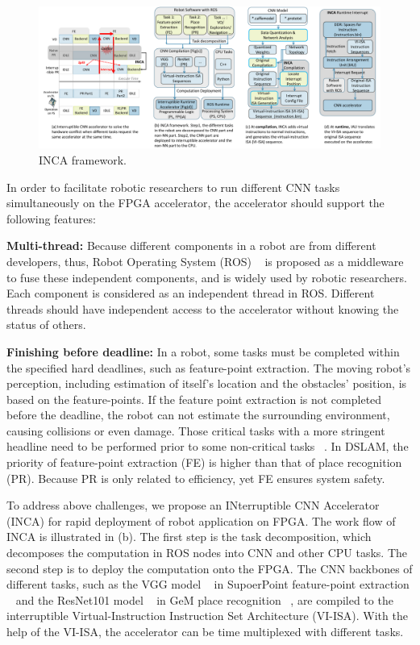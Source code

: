 \begin{figure}[t]
	\centering
    \includegraphics[width=0.99\linewidth]{fig/inca.pdf}
    \caption{ INCA framework.  
    }
	\label{fig:inca}
\end{figure}

In order to facilitate robotic researchers to run different CNN tasks simultaneously on the FPGA accelerator, the accelerator should support the following features:

\textbf{Multi-thread:} Because different components in a robot are from different developers, thus, Robot Operating System (ROS)  ~\cite{quigley2009ros} is proposed as a middleware to fuse these independent components, and is widely used by robotic researchers. Each component is considered as an independent thread in ROS. Different threads should have independent access to the accelerator without knowing the status of others.

\textbf{Finishing before deadline:} In a robot, some tasks must be completed within the specified hard deadlines, such as feature-point extraction. The moving robot's perception, including estimation of itself's location and the obstacles' position, is based on the feature-points. If the feature point extraction is not completed before the deadline, the robot can not estimate the surrounding environment, causing collisions or even damage. Those critical tasks with a more stringent headline need to be performed prior to some non-critical tasks ~\cite{RamsauerKLM17}. In DSLAM, the priority of feature-point extraction (FE) is higher than that of place recognition (PR). Because PR is only related to efficiency, yet FE ensures system safety.

To address above challenges, we propose an INterruptible CNN Accelerator (INCA) for rapid deployment of robot application on FPGA. 
The work flow of INCA is illustrated in (b). 
The first step is the task decomposition, which decomposes the computation in ROS nodes into CNN and other CPU tasks.
The second step is to deploy the computation onto the FPGA. 
The CNN backbones of different tasks, such as the VGG model  ~\cite{kim2016accurate} in SupoerPoint feature-point extraction  ~\cite{detone2018superpoint} and the ResNet101 model  ~\cite{he2016deep} in GeM place recognition  ~\cite{radenovic2018fine}, are compiled to the interruptible Virtual-Instruction Instruction Set Architecture (VI-ISA). With the help of the VI-ISA, the accelerator can be time multiplexed with different tasks.


